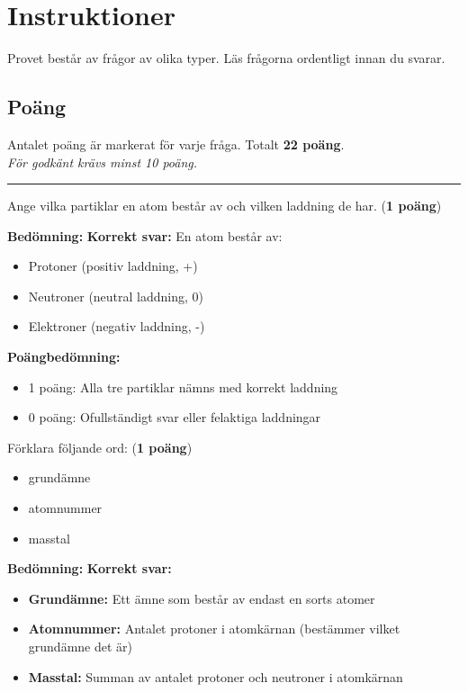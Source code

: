 \documentclass[12pt]{exam}
\newenvironment{answer}
  {\begin{framed}\color{blue}\textbf{Bedömning:} }
  {\end{framed}}
\begin{document}
\section*{Instruktioner}
Provet består av frågor av olika typer. Läs frågorna ordentligt innan du svarar.

\subsection*{Poäng}
Antalet poäng är markerat för varje fråga. Totalt \textbf{22 poäng}.\\ \textit{För godkänt krävs minst 10 poäng.}

\vspace{5mm}
\hrule

\begin{questions}

\question Ange vilka partiklar en atom består av och vilken laddning de har. (\textbf{1 poäng})
\vspace{5mm}

\begin{answer}
\textbf{Korrekt svar:} En atom består av:
\begin{itemize}
  \item Protoner (positiv laddning, +)
  \item Neutroner (neutral laddning, 0)
  \item Elektroner (negativ laddning, -)
\end{itemize}

\textbf{Poängbedömning:}
\begin{itemize}
  \item 1 poäng: Alla tre partiklar nämns med korrekt laddning
  \item 0 poäng: Ofullständigt svar eller felaktiga laddningar
\end{itemize}
\end{answer}
\vspace{5mm}

\question Förklara följande ord: (\textbf{1 poäng})
\begin{itemize}
  \item grundämne
  \item atomnummer
  \item masstal
\end{itemize}
\vspace{5mm}

\begin{answer}
\textbf{Korrekt svar:}
\begin{itemize}
  \item \textbf{Grundämne:} Ett ämne som består av endast en sorts atomer
  \item \textbf{Atomnummer:} Antalet protoner i atomkärnan (bestämmer vilket grundämne det är)
  \item \textbf{Masstal:} Summan av antalet protoner och neutroner i atomkärnan
\end{itemize}


\end{answer}
\end{questions}
\end{document}
